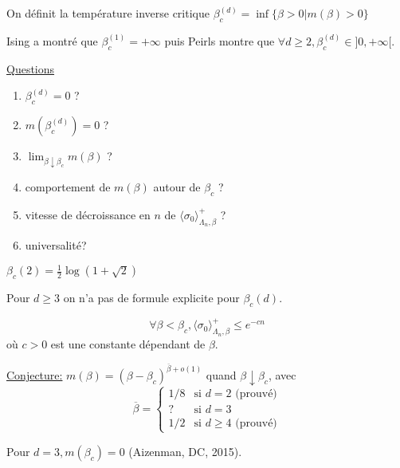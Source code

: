 \documentclass[a4paper,12pt]{report}
\begin{document}
\begin{defi}
On définit la température inverse critique $\beta_c^{(d)} = \inf \lbrace \beta > 0 \vert m(\beta) > 0 \rbrace$
\end{defi}

Ising a montré que $\beta_c^{(1)} = + \infty$ puis Peirls montre que $\forall d \geq 2, \beta_c^{(d)} \in ]0, + \infty [$.
\newline

\underline{Questions}
\begin{enumerate}
\item $\beta_c^{(d)} = 0$ ?
\item $m(\beta_c^{(d)})=0$ ?
\item $\lim_{\beta \downarrow \beta_c} m(\beta)$ ?
\item comportement de $m(\beta)$ autour de $\beta_c$ ?
\item vitesse de décroissance en $n$ de $\langle \sigma_0 \rangle^+_{\Lambda_n, \beta}$ ?
\item universalité?
\end{enumerate}

\begin{thm}
$\beta_c(2) = \frac{1}{2} \log(1 + \sqrt{2})$
\end{thm}

Pour $d \geq 3$ on n'a pas de formule explicite pour $\beta_c(d)$.

\begin{thm}
$$\forall \beta < \beta_c, \langle \sigma_0 \rangle^+_{\Lambda_n, \beta} \leq e^{-cn}$$
où $c>0$ est une constante dépendant de $\beta$.
\end{thm}

\underline{Conjecture:} $m(\beta) = (\beta - \beta_c)^{\overline{\beta} + o(1)}$ quand $\beta \downarrow \beta_c$, avec
\begin{equation*}
\overline{\beta} =
\begin{cases}
1/8 & \text{si } d=2 \text{ (prouvé)}\\
? & \text{si } d=3 \\
1/2 & \text{si } d \geq 4 \text{ (prouvé)}
\end{cases}
\end{equation*}

Pour $d=3, m(\beta_c)=0$ (Aizenman, DC, 2015).
\newline
\end{document}

